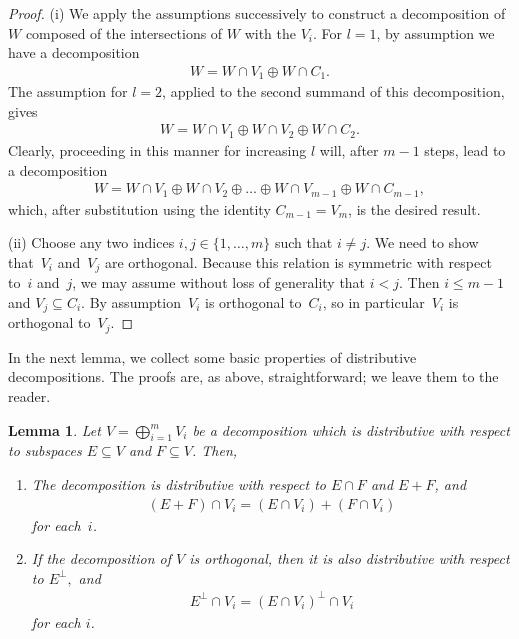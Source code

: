 \documentclass[pdftex]{sigma}
\numberwithin{equation}{section}
\newtheorem{Lemma}[Theorem]{Lemma}
\begin{document}
\begin{proof}
(i) We apply the assumptions successively to construct a decomposition of $W$ composed of the intersections of $W$ with the $V_i$. For $l=1$, by assumption we have a decomposition
\begin{gather*}
W = W \cap V_1 \oplus W \cap C_1.
\end{gather*}
The assumption for $l=2$, applied to the second summand of this decomposition, gives
\begin{gather*}
W = W \cap V_1 \oplus W \cap V_2 \oplus W \cap C_2.
\end{gather*}
Clearly, proceeding in this manner for increasing $l$ will, after $m-1$ steps, lead to a decomposition
\begin{gather*}
W = W \cap V_1 \oplus W \cap V_2 \oplus  \dots  \oplus W \cap V_{m-1} \oplus W \cap C_{m-1},
\end{gather*}
which, after substitution using the identity $C_{m-1} = V_m$, is the desired result.

(ii) Choose any two indices $i, j \in \{1,\dots ,m\}$ such that $i \neq j$. We need to show that~$V_i$ and~$V_j$ are orthogonal. Because this relation is symmetric with respect to~$i$ and~$j$, we may assume without loss of generality that $i < j$. Then $i \leq m-1$ and $V_j \subseteq C_i$. By assumption~$V_i$ is orthogonal to~$C_i$, so in particular~$V_i$ is orthogonal to~$V_j$.
\end{proof}

In the next lemma, we collect some basic properties of distributive decompositions. The proofs are, as above, straightforward; we leave them to the reader.

\begin{Lemma}\label{distributivity properties}
Let $V = \bigoplus_{i=1}^m V_i$ be a decomposition which is distributive with respect to subspaces $E \subseteq V$ and $F \subseteq V$. Then,
\begin{enumerate}[{\rm (i)}]\itemsep=0pt
\item The decomposition is distributive with respect to $E \cap F$ and $E + F$, and
\begin{gather*}%
(E + F) \cap V_i = (E \cap V_i) + (F \cap V_i)
\end{gather*}
for each~$i$.
\item If the decomposition of $V$ is orthogonal, then it is also distributive with respect to $E^{\perp},$ and
\begin{gather*}%
E^{\perp} \cap V_i = (E \cap V_i)^{\perp} \cap V_i
\end{gather*}
for each $i$.
\end{enumerate}
\end{Lemma}
\end{document}

